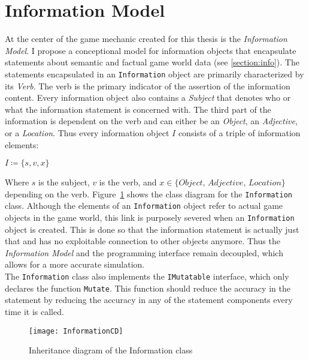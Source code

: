 \section{Information Model}
At the center of the game mechanic created for this thesis is the \textit{Information Model}. I propose a conceptional model for information objects that encapsulate statements about semantic and factual game world data (see \ref{section:info}). The statements encapsulated in an \verb|Information| object are primarily characterized by its \textit{Verb}. The verb is the primary indicator of the assertion of the information content. Every information object also contains a \textit{Subject} that denotes who or what the information statement is concerned with. The third part of the information is dependent on the verb and can either be an \textit{Object}, an \textit{Adjective}, or a \textit{Location}.
Thus every information object $I$ consists of a triple of information elements:
\begin{center}
	$I \coloneqq \{s, v, x\}$ 
\end{center}
Where $s$ is the subject, $v$ is the verb, and $x \in \{\textit{Object, Adjective, Location}\}$ depending on the verb. Figure~\ref{fig:informationCD} shows the class diagram for the \verb|Information| class. Although the elements of an \verb|Information| object refer to actual game objects in the game world, this link is purposely severed when an \verb|Information| object is created. This is done so that the information statement is actually just that and has no exploitable connection to other objects anymore. Thus the \textit{Information Model} and the programming interface remain decoupled, which allows for a more accurate simulation.\\
The \verb|Information| class also implements the \verb|IMutatable| interface, which only declares the function \verb|Mutate|. This function should reduce the accuracy in the statement by reducing the accuracy in any of the statement components every time it is called.
\begin{figure}
	\centering
	\texttt{[image: InformationCD]}
	\caption{Inheritance diagram of the Information class}
	\label{fig:informationCD}
\end{figure}
